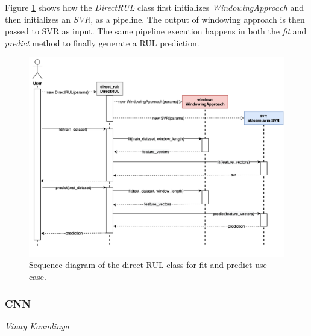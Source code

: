 Figure \ref{fig:rul_seq_direct_rul} shows how the \textit{DirectRUL} class first initializes \textit{WindowingApproach} and then initializes an \textit{SVR}, as a pipeline. The output of windowing approach is then passed to SVR as input. The same pipeline execution happens in both the \textit{fit} and \textit{predict} method to finally generate a RUL prediction.
\begin{figure}[H]
    \centering
    \includegraphics[width=\textwidth]{gfx/rul_seq_direct_rul}
    \caption{Sequence diagram of the direct RUL class for fit and predict use case.}
    \label{fig:rul_seq_direct_rul}
\end{figure}

\subsubsection{CNN}
\vspace*{-12.5mm}\hfill{\normalsize\emph{Vinay Kaundinya}}

